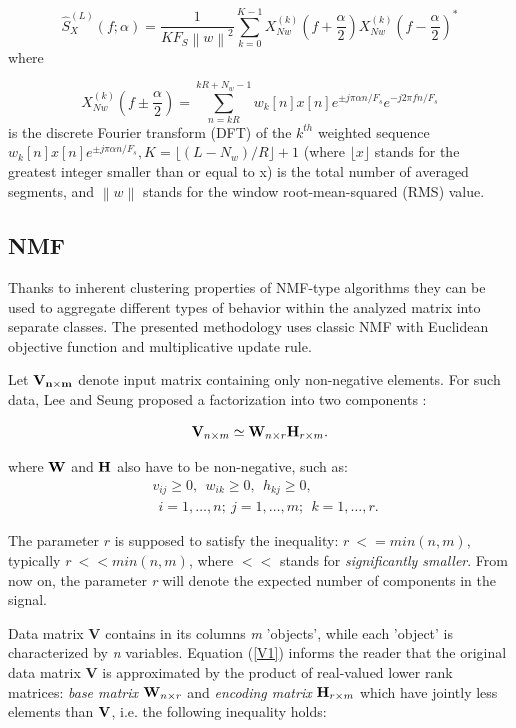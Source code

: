 \documentclass[3p, 12pt]{elsarticle} %
\newcommand{\norm}[1]{\left\lVert#1\right\rVert}
\begin{document}
\begin{equation}
\hat{S}_X^{(L)}(f;\alpha)=\frac{1}{KF_S\norm{w}^2}\sum_{k=0}^{K-1}X^{(k)}_{Nw}\left( f+\frac{\alpha}{2}\right)X^{(k)}_{Nw}\left( f-\frac{\alpha}{2}\right)^*
\end{equation} 
where

\begin{equation}
X^{(k)}_{Nw}\left( f\pm\frac{\alpha}{2}\right)=\sum_{n=kR}^{kR+N_w-1}w_k[n]x[n]e^{\pm j\pi\alpha n/F_s}e^{-j2\pi fn/F_s}
\end{equation} 
is the discrete Fourier transform (DFT) of the $k^{th}$ weighted sequence $w_k[n]x[n]e^{\pm j\pi\alpha n/F_s}, K=\lfloor (L-N_w)/R\rfloor+1$ (where $\lfloor x \rfloor$ stands for the greatest integer smaller than or equal to x) is the total number of averaged segments, and $\norm{w}$ stands for the window root-mean-squared (RMS) value. 

\subsection{NMF}
Thanks to inherent clustering properties of NMF-type algorithms they can be used to aggregate different types of behavior within the analyzed matrix into separate classes. The presented methodology uses classic NMF with Euclidean objective function and multiplicative update rule.

Let $\bf{V}_{n\times m}$ denote input matrix containing only non-negative elements. For such data, Lee and Seung proposed a factorization into two components \cite{lee2001algorithms}:

\begin{equation}\label{V1} 
    {\bf V}_{n\times m}\simeq
    {\bf W}_{n\times r}{\bf H}_{r\times m}. 
\end{equation} 

where ${\bf W}$ and ${\bf H}$ also have to be non-negative, such as:
\begin{align*}
    &v_{ij}\ge0,~~w_{ik}\ge 0,~~ h_{kj}\ge 0,\\
    &~~i=1, \dots, n; ~j=1,\dots, m;
                ~~k=1,\dots,r.
\end{align*}

The parameter $r$ is supposed to satisfy the inequality: \mbox{$r~<= min(n,m)$},~ typically \mbox{$r~<<min(n,m)$}, where $<<$ stands for \emph{significantly smaller}. From now on, the parameter \emph{r} will denote the expected number of components in the signal.

Data matrix \textbf{V} contains in its columns \textit{m} 'objects', while each 'object' is characterized by \textit{n} variables. Equation (\ref{V1}) informs the reader that the original data matrix \textbf{V} is approximated by the product of real-valued lower rank matrices: \emph{base matrix} ${\bf W}_{n\times r}$ and \emph{encoding matrix} ${\bf H}_{r\times m}$  which have jointly less elements than ${\bf V}$, i.e. the following inequality holds:
\end{document}
